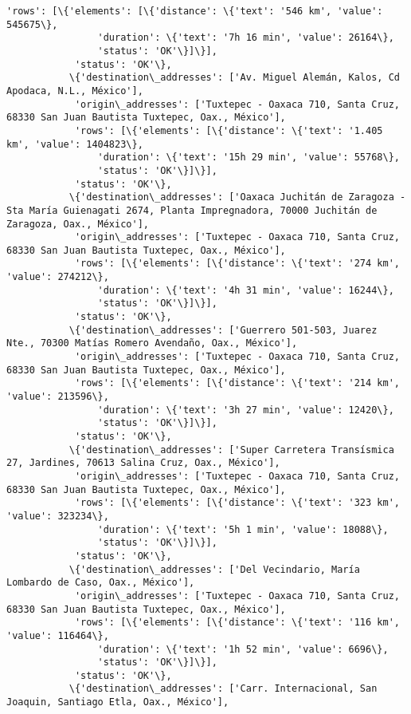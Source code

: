 \documentclass[11pt]{article}
\begin{document}
\begin{Verbatim}[commandchars=\\\{\}]
            'rows': [\{'elements': [\{'distance': \{'text': '546 km', 'value': 545675\},
                'duration': \{'text': '7h 16 min', 'value': 26164\},
                'status': 'OK'\}]\}],
            'status': 'OK'\},
           \{'destination\_addresses': ['Av. Miguel Alemán, Kalos, Cd Apodaca, N.L., México'],
            'origin\_addresses': ['Tuxtepec - Oaxaca 710, Santa Cruz, 68330 San Juan Bautista Tuxtepec, Oax., México'],
            'rows': [\{'elements': [\{'distance': \{'text': '1.405 km', 'value': 1404823\},
                'duration': \{'text': '15h 29 min', 'value': 55768\},
                'status': 'OK'\}]\}],
            'status': 'OK'\},
           \{'destination\_addresses': ['Oaxaca Juchitán de Zaragoza - Sta María Guienagati 2674, Planta Impregnadora, 70000 Juchitán de Zaragoza, Oax., México'],
            'origin\_addresses': ['Tuxtepec - Oaxaca 710, Santa Cruz, 68330 San Juan Bautista Tuxtepec, Oax., México'],
            'rows': [\{'elements': [\{'distance': \{'text': '274 km', 'value': 274212\},
                'duration': \{'text': '4h 31 min', 'value': 16244\},
                'status': 'OK'\}]\}],
            'status': 'OK'\},
           \{'destination\_addresses': ['Guerrero 501-503, Juarez Nte., 70300 Matías Romero Avendaño, Oax., México'],
            'origin\_addresses': ['Tuxtepec - Oaxaca 710, Santa Cruz, 68330 San Juan Bautista Tuxtepec, Oax., México'],
            'rows': [\{'elements': [\{'distance': \{'text': '214 km', 'value': 213596\},
                'duration': \{'text': '3h 27 min', 'value': 12420\},
                'status': 'OK'\}]\}],
            'status': 'OK'\},
           \{'destination\_addresses': ['Super Carretera Transísmica 27, Jardines, 70613 Salina Cruz, Oax., México'],
            'origin\_addresses': ['Tuxtepec - Oaxaca 710, Santa Cruz, 68330 San Juan Bautista Tuxtepec, Oax., México'],
            'rows': [\{'elements': [\{'distance': \{'text': '323 km', 'value': 323234\},
                'duration': \{'text': '5h 1 min', 'value': 18088\},
                'status': 'OK'\}]\}],
            'status': 'OK'\},
           \{'destination\_addresses': ['Del Vecindario, María Lombardo de Caso, Oax., México'],
            'origin\_addresses': ['Tuxtepec - Oaxaca 710, Santa Cruz, 68330 San Juan Bautista Tuxtepec, Oax., México'],
            'rows': [\{'elements': [\{'distance': \{'text': '116 km', 'value': 116464\},
                'duration': \{'text': '1h 52 min', 'value': 6696\},
                'status': 'OK'\}]\}],
            'status': 'OK'\},
           \{'destination\_addresses': ['Carr. Internacional, San Joaquin, Santiago Etla, Oax., México'],

\end{Verbatim}
\end{document}
